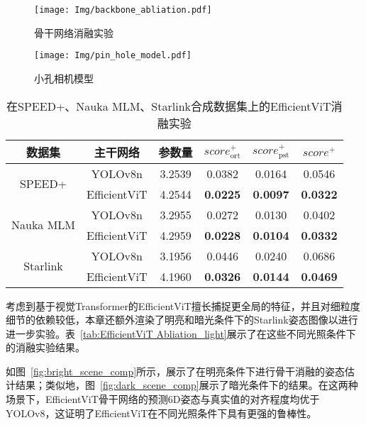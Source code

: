 \begin{figure}[htbp]
	\centering
	\texttt{[image: Img/backbone\_abliation.pdf]}
	\caption{骨干网络消融实验}
	\label{fig:backbone_abliation}
	\vspace{-3ex}
\end{figure}
\begin{figure}[htbp]
	\centering
	\texttt{[image: Img/pin\_hole\_model.pdf]}
	\caption{小孔相机模型}
	\label{fig:pin_hole_model}
	\vspace{-3ex}
\end{figure}
\begin{table}[htbp]
	\centering
	\caption{在SPEED+、Nauka MLM、Starlink合成数据集上的EfficientViT消融实验}
	\label{tab:EfficientViTAblation}
	{%
		\begin{tabular}{c c c c c c} 
			\toprule[1.5pt]
			数据集 & 主干网络 & 参数量 & $score_{\text{ort}}^+$ & $score_{\text{pst}}^+$ & $score^+$ \\
			\midrule[1pt]
			\multirow{2}{*}{SPEED+}
			& YOLOv8n      & 3.2539 & 0.0382            & 0.0164            & 0.0546 \\
			& EfficientViT & 4.2544 & \textbf{0.0225}   & \textbf{0.0097}   & \textbf{0.0322} \\
			\midrule[1pt]
			\multirow{2}{*}{Nauka MLM}
			& YOLOv8n      & 3.2955 & 0.0272            & 0.0130            & 0.0402 \\
			& EfficientViT & 4.2959 & \textbf{0.0228}   & \textbf{0.0104}   & \textbf{0.0332} \\
			\midrule[1pt]
			\multirow{2}{*}{Starlink}
			& YOLOv8n      & 3.1956 & 0.0446            & 0.0240            & 0.0686 \\
			& EfficientViT & 4.1960 & \textbf{0.0326}   & \textbf{0.0144}   & \textbf{0.0469} \\
			\bottomrule[1.5pt]
		\end{tabular}
	}
\end{table}

考虑到基于视觉Transformer的EfficientViT擅长捕捉更全局的特征，并且对细粒度细节的依赖较低，本章还额外渲染了明亮和暗光条件下的Starlink姿态图像以进行进一步实验。表~\ref{tab:EfficientViT Abliation_light}展示了在这些不同光照条件下的消融实验结果。

如图~\ref{fig:bright_scene_comp}所示，展示了在明亮条件下进行骨干消融的姿态估计结果；类似地，图~\ref{fig:dark_scene_comp}展示了暗光条件下的结果。在这两种场景下，EfficientViT骨干网络的预测6D姿态与真实值的对齐程度均优于YOLOv8，这证明了EfficientViT在不同光照条件下具有更强的鲁棒性。

